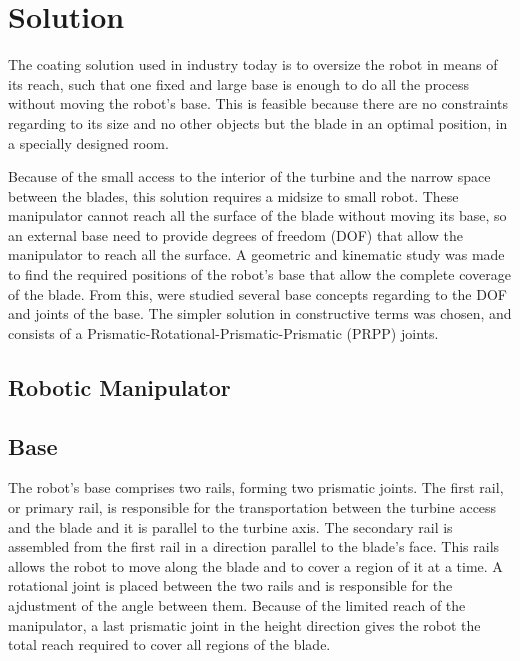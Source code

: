 \section{Solution}


The coating solution used in industry today is to oversize the robot
in means of its reach, such that one fixed and large base is enough to do all 
the process without moving the robot's base. 
This is feasible because there are no constraints regarding to its size and no
other objects but the blade in an optimal position, in a specially designed room.

Because of the small access to the interior of the turbine and the narrow space
between the blades, this solution requires a midsize to small robot. 
These manipulator cannot reach all the surface of the blade without moving its
base, so an external base need to provide degrees of freedom (DOF) that allow
the manipulator to reach all the surface.
A geometric and kinematic study was made to find the required positions of the
robot's base that allow the complete coverage of the blade.
From this, were studied several base concepts regarding to the DOF and joints of
the base. The simpler solution in constructive terms was chosen, and consists of
a Prismatic-Rotational-Prismatic-Prismatic (PRPP) joints.


\subsection{Robotic Manipulator}

\subsection{Base}

The robot's base comprises two rails, forming two prismatic joints. The first
rail, or primary rail, is responsible for the transportation between the turbine
access and the blade and it is parallel to the turbine axis. The secondary rail
is assembled from the first rail in a direction parallel to the blade's face.
This rails allows the robot to move along the blade and to cover a region of it
at a time. A rotational joint is placed between the two rails and is responsible
for the ajdustment of the angle between them.
Because of the limited reach of the manipulator, a last prismatic joint in the
height direction gives the robot the total reach required to cover all regions
of the blade.

